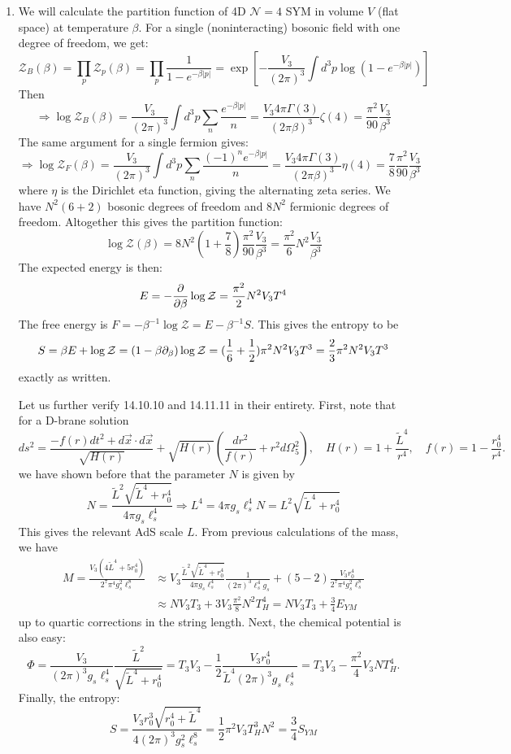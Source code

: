 \documentclass[11pt, class=article, crop=false]{standalone}
\begin{document}
\begin{enumerate}
	\item We will calculate the partition function of 4D $\mathcal N=4$ SYM in volume $V$ (flat space) at temperature $\beta$. For a single (noninteracting) bosonic field with one degree of freedom, we get:
	\[
		\mathcal Z_B(\beta) = \prod_{p} \mathcal Z_{p}(\beta) = \prod_{p} \frac{1}{1- e^{-\beta |p|}} = \exp\left[-\frac{V_3}{(2\pi)^3} \int d^3 p \log(1 - e^{-\beta |p|}) \right]
	\]
	Then
	\[
		\Rightarrow \log \mathcal Z_B(\beta) = \frac{V_3}{(2\pi)^3} \int d^3 p \sum_n \frac{e^{-\beta |p|}}{n} = \frac{V_3 4 \pi \Gamma(3)}{(2\pi \beta)^3}  \zeta(4) = \frac{\pi^2}{90} \frac{V_3}{\beta^3}
	\]
	The same argument for a single fermion gives:
	\[
		\Rightarrow \log \mathcal Z_F(\beta) = \frac{V_3}{(2\pi)^3} \int d^3 p \sum_n \frac{(-1)^n e^{-\beta |p|}}{n} = \frac{V_3 4 \pi \Gamma(3)}{(2\pi \beta)^3}  \eta(4) = \frac78 \frac{\pi^2}{90} \frac{V_3}{\beta^3}
	\]
	where $\eta$ is the Dirichlet eta function, giving the alternating zeta series. We have $N^2 (6 + 2)$ bosonic degrees of freedom and $8 N^2$ fermionic degrees of freedom. Altogether this gives the partition function:
	\[
		\log \mathcal Z(\beta) = 8 N^2 (1 + \frac78) \frac{\pi^2}{90} \frac{V_3}{\beta^3} = \frac{\pi^2}{6} N^2 \frac{V_3}{\beta^3}
	\]
	The expected energy is then:
	\[
		E = - \frac{\partial}{\partial \beta} \log \mathcal Z = \frac{\pi^2}{2} N^2 V_3 T^4
	\]
	The free energy is $F = -\beta^{-1} \log \mathcal Z = E - \beta^{-1} S$. This gives the entropy to be 
	\[
		S = \beta E + \log \mathcal Z = (1 - \beta \partial_\beta) \log \mathcal Z = (\frac16 + \frac12) \pi^2 N^2 V_3 T^3 = \frac23 \pi^2 N^2 V_3 T^3
	\]
	exactly as written. 
	
	Let us further verify 14.10.10 and 14.11.11 in their entirety. First, note that for a D-brane solution
	\[
		ds^2 = \frac{- f(r) dt^2 + d \vec x \cdot d \vec x}{\sqrt{H(r)}} + \sqrt{H(r)}\left(\frac{dr^2}{f(r)} + r^2 d \Omega_5^2 \right), \quad H(r) = 1 + \frac{\tilde L^4}{r^4}, \quad f(r) = 1 - \frac{r_0^4}{r^4}.
	\]
	we have shown before that the parameter $N$ is given by
	\[
		N = \frac{\tilde L^2 \sqrt{\tilde L^4 + r_0^4}}{4 \pi g_s \ell_s^4} \Rightarrow L^4 = 4 \pi g_s \ell_s^4 N = L^2 \sqrt{\tilde L^4 + r_0^4}
	\]
	This gives the relevant AdS scale $L$. From previous calculations of the mass, we have
	\[
	\begin{aligned}
		M = \frac{V_3 (4 \tilde L^4 + 5 r_0^4)}{2^7 \pi^4 g_s^2 \ell_s^8} &\approx V_3 \frac{\tilde L^2 \sqrt{\tilde L^4 + r_0^4}}{4 \pi g_s \ell_s^4} \frac{1}{(2\pi)^3 \ell_s^4 g_s} + (5 - 2) \frac{V_3 r_0^4}{2^7 \pi^4 g_s^2 \ell_s^8}\\
		& \approx  N V_3 T_3+ 3 V_3 \frac{\pi^2}{8} N^2 T_H^{4} = N V_3 T_3 + \frac34 E_{YM}
	\end{aligned}
	\]
	up to quartic corrections in the string length. Next, the chemical potential is also easy:
	\[
		\Phi = \frac{V_3}{(2\pi)^3 g_s \ell_s^4} \frac{\tilde L^2}{\sqrt{\tilde L^4 + r_0^4}} = T_3 V_3 - \frac12 \frac{V_3 r_0^4}{\tilde L^4 (2\pi)^3 g_s \ell_s^4} = T_3 V_3 - \frac{\pi^2}{4}  V_3 N T_H^4.
	\]
	Finally, the entropy:
	\[
		S = \frac{V_3 r_0^3 \sqrt{r_0^4 + \tilde L^4}}{4 (2\pi)^3 g_s^2 \ell_s^8} = \frac12 \pi^2 V_3 T_H^3 N^2  = \frac34 S_{YM}
	\]
	

\end{enumerate}
\end{document}
